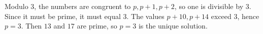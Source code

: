 Modulo $3$, the numbers are congruent to $p,p+1,p+2$, so one is divisible by $3$. Since it must be prime, it must equal $3$. The values $p+10,p+14$ exceed $3$, hence $p=3$. Then $13$ and $17$ are prime, so $\boxed{p=3}$ is the unique solution.
